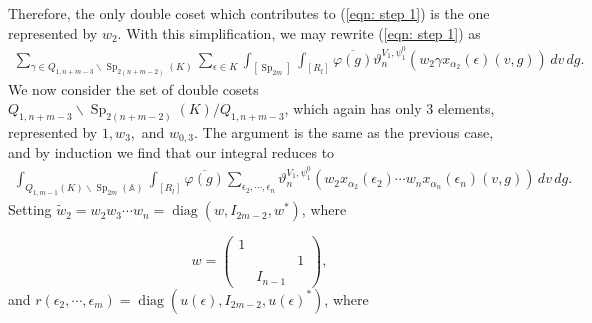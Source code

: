 \documentclass[11pt,reqno]{amsart}
\theoremstyle{definition}
\theoremstyle{remark}
\theoremstyle{definition}
\begin{document}
Therefore, the only double coset which contributes to (\ref{eqn: step 1}) is the one represented by $w_2$. With this simplification, we may rewrite (\ref{eqn: step 1}) as
\begin{align}\label{eqn: step 2}
\sum_{{\gamma}\in Q_{1,n+m-3}\backslash \operatorname{Sp}_{2(n+m-2)}(K)}\sum_{{\epsilon}\in K} \int_{[\operatorname{Sp}_{2m}]}\int_{[R_l]}\overline{\varphi(g)}\vartheta^{V_1,\psi_1^0}_{n}(w_2{\gamma} x_{{\alpha}_2}({\epsilon})(v,g))\,dv\,dg.
\end{align}
We now consider the set of double cosets $Q_{1,n+m-3}\backslash \operatorname{Sp}_{2(n+m-2)}(K)/Q_{1,n+m-3}$, which again has only 3 elements, represented by $1, w_3,$ and $ w_{0,3}$. The argument is the same as the previous case, and by induction we find that our integral reduces to
\begin{align}\label{eqn: unravel}
\int_{Q_{1,m-1}(K)\backslash\operatorname{Sp}_{2m}({\mathbb A})}\int_{[R_l]}\overline{\varphi(g)}\sum_{{\epsilon}_2,\cdots,{\epsilon}_n}\vartheta^{V_1,\psi_1^0}_{n}(w_2 x_{{\alpha}_2}({\epsilon}_2)\cdots w_n x_{{\alpha}_n}({\epsilon}_n)(v,g))\,dv\,dg.
\end{align}
Setting $\tilde{w}_2 = w_2w_3\cdots w_n=\operatorname{diag}(w,I_{2m-2},w^\ast)$, where

\[w=\left(\begin{array}{ccc}
										1&&\\
										&&1\\
										&I_{n-1}&
										\end{array}\right),\]
										 and 
$r({\epsilon}_2,\cdots, {\epsilon}_m) = \operatorname{diag}(u({\epsilon}),I_{2m-2}, u({\epsilon})^*)$, where 
\end{document}
